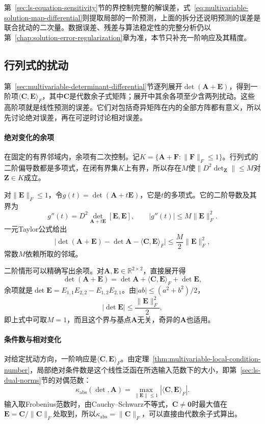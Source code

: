 第~\ref{sec:ls-equation-sensitivity}节的界控制完整的解误差，式~\eqref{eq:multivariable-solution-map-differential}则提取局部的一阶预测，上面的拆分还说明预测的误差是联合扰动的二次量。数据误差、残差与算法稳定性的完整分析仍以第~\ref{chap:solution-error-regularization}章为准，本节只补充一阶响应及其精度。

\subsection{行列式的扰动}
\label{sec:multivariable-determinant-perturbation}

第~\ref{sec:multivariable-determinant-differential}节逐列展开$\det(\bm A+\bm E)$，得到一阶项$\langle\bm C,\bm E\rangle_F$，其中$\bm C$是代数余子式矩阵；展开中其余各项至少含两列扰动。这些高阶项就是线性预测的误差。它们对包括奇异矩阵在内的全部方阵都有意义，所以先讨论绝对误差，再在可逆时讨论相对误差。

\paragraph{绝对变化的余项}
在固定的有界邻域内，余项有二次控制。记$K=\{\bm A+\bm F:\lVert\bm F\rVert_F\leq1\}$。行列式的二阶偏导数都是多项式，在闭有界集$K$上有界，所以存在$M$使$\lVert D^2\det_{\bm Z}\rVert\leq M$对$\bm Z\in K$成立。

对$\lVert\bm E\rVert_F\leq1$，令$g(t)=\det(\bm A+t\bm E)$，它是$t$的多项式。它的二阶导数及其界为
\[
 g''(t)=D^2\det_{\bm A+t\bm E}[\bm E,\bm E],\qquad |g''(t)|\leq M\lVert\bm E\rVert_F^2 .
\]
一元Taylor公式给出
\[
 \bigl|\det(\bm A+\bm E)-\det\bm A-\langle\bm C,\bm E\rangle_F\bigr|\leq\frac M2\lVert\bm E\rVert_F^2 ,
\]
常数$M$依赖所取的邻域。

二阶情形可以精确写出余项。对$\bm A,\bm E\in\mathbb R^{2\times2}$，直接展开得
\[
 \det(\bm A+\bm E)=\det\bm A+\langle\bm C,\bm E\rangle_F+\det\bm E ,
\]
余项就是$\det\bm E=E_{1,1}E_{2,2}-E_{1,2}E_{2,1}$。由$|ab|\leq(a^2+b^2)/2$，
\[
 |\det\bm E|\leq\frac{\lVert\bm E\rVert_F^2}2 ,
\]
即上式中可取$M=1$，而且这个界与基点$\bm A$无关，奇异的$\bm A$也适用。

\paragraph{条件数与相对变化}
对给定扰动方向，一阶响应是$\langle\bm C,\bm E\rangle_F$。由定理~\ref{thm:multivariable-local-condition-number}，局部绝对条件数是这个线性泛函在所选输入范数下的大小，即第~\ref{sec:ls-dual-norms}节的对偶范数：
\[
 \kappa_{\mathrm{abs}}(\det,\bm A)=\max_{\lVert\bm E\rVert\leq1}|\langle\bm C,\bm E\rangle_F| .
\]
输入取Frobenius范数时，由Cauchy--Schwarz不等式，$\bm C\neq\bm0$时最大值在$\bm E=\bm C/\lVert\bm C\rVert_F$处取到，所以$\kappa_{\mathrm{abs}}=\lVert\bm C\rVert_F$，可以直接由代数余子式算出。

